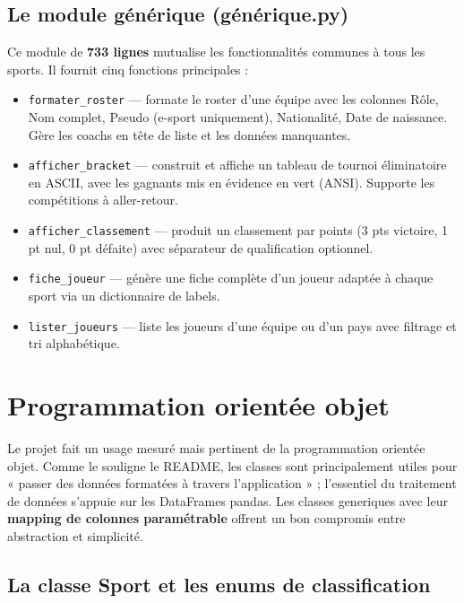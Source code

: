 \documentclass[12pt,a4paper]{article}
\newcommand{\code}[1]{\texttt{#1}}
\begin{document}
\subsection{Le module générique (générique.py)}

Ce module de \textbf{733 lignes} mutualise les fonctionnalités communes à tous les
sports. Il fournit cinq fonctions principales :

\begin{itemize}
  \item \code{formater\_roster} --- formate le roster d'une équipe avec les colonnes
        Rôle, Nom complet, Pseudo (e-sport uniquement), Nationalité, Date de naissance.
        Gère les coachs en tête de liste et les données manquantes.
  \item \code{afficher\_bracket} --- construit et affiche un tableau de tournoi
        éliminatoire en ASCII, avec les gagnants mis en évidence en vert (ANSI).
        Supporte les compétitions à aller-retour.
  \item \code{afficher\_classement} --- produit un classement par points (3 pts victoire,
        1 pt nul, 0 pt défaite) avec séparateur de qualification optionnel.
  \item \code{fiche\_joueur} --- génère une fiche complète d'un joueur adaptée à chaque
        sport via un dictionnaire de labels.
  \item \code{lister\_joueurs} --- liste les joueurs d'une équipe ou d'un pays avec
        filtrage et tri alphabétique.
\end{itemize}

\section{Programmation orientée objet}
\label{sec:poo}

Le projet fait un usage mesuré mais pertinent de la programmation orientée objet. Comme
le souligne le README, les classes sont principalement utiles pour « passer des données
formatées à travers l'application » ; l'essentiel du traitement de données s'appuie sur
les DataFrames pandas. Les classes generiques avec leur \textbf{mapping de colonnes
paramétrable} offrent un bon compromis entre abstraction et simplicité.

\subsection{La classe Sport et les enums de classification}
\end{document}
